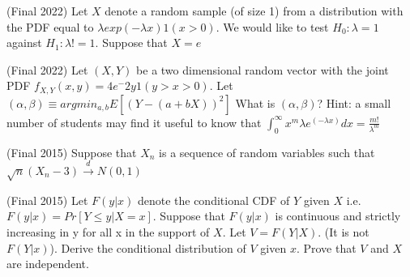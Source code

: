 \documentclass[answers]{exam}
\begin{document}
\begin{questions}
\question (Final 2022) Let $X$ denote a random sample (of size 1) from a distribution with the PDF equal to $\lambda exp (-\lambda x)1(x>0)$. We would like to test $H_0 : \lambda = 1$ against $H_1 : \lambda != 1$. Suppose that $X=e$

\question (Final 2022) Let $(X,Y)$ be a two dimensional random vector with the joint PDF $f_{X,Y}(x,y) = 4e^-{2y} 1(y>x>0)$. Let $(\alpha, \beta) \equiv argmin_{a,b} E[(Y-(a+bX))^2]$ What is $(\alpha, \beta)$? Hint: a small number of students may find it useful to know that $\int_0^\infty x^m \lambda e^(-\lambda x)dx=\frac{m!}{\lambda^m}$


\question (Final 2015) Suppose that $X_n$ is a sequence of random variables such that $\sqrt{n}(X_n-3) \xrightarrow{d} N(0,1)$

\question (Final 2015) Let $F(y|x)$ denote the conditional CDF of $Y$ given $X$ i.e. $F(y|x) = Pr[Y \leq y|X=x]$. Suppose that $F(y|x)$ is continuous and strictly increasing in y for all x in the support of $X$. Let $V = F(Y|X)$. (It is not $F(Y|x)$). Derive the conditional distribution of $V$ given $x$. Prove that $V$ and $X$ are independent.
\begin{solution} 
\end{solution}


\end{questions}
\end{document}
